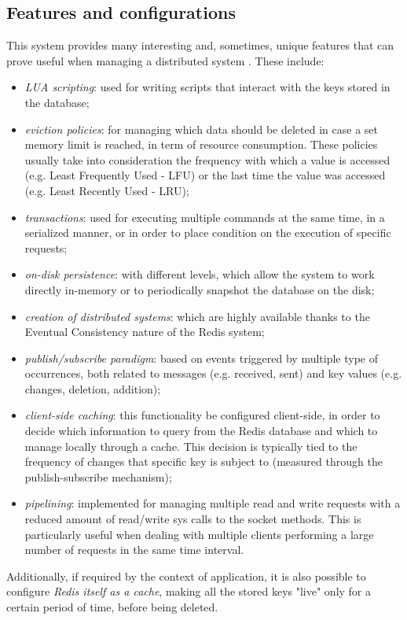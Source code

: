 \subsection{Features and configurations}
This system provides many interesting and, sometimes, unique features that can prove useful when managing a distributed system \cite{site:redis-doc}. These include:
\begin{itemize}
	\item \textit{LUA scripting}: used for writing scripts that interact with the keys stored in the database;
	\item \textit{eviction policies}: for managing which data should be deleted in case a set memory limit is reached, in term of resource consumption. These policies usually take into consideration the frequency with which a value is accessed (e.g. Least Frequently Used - LFU) or the last time the value was accessed (e.g. Least Recently Used - LRU);
	\item \textit{transactions}: used for executing multiple commands at the same time, in a serialized manner, or in order to place condition on the execution of specific requests;
	\item \textit{on-disk persistence}: with different levels, which allow the system to work directly in-memory or to periodically snapshot the database on the disk;
	\item \textit{creation of distributed systems}: which are highly available thanks to the Eventual Consistency nature of the Redis system;
	\item \textit{publish/subscribe paradigm}: based on events triggered by multiple type of occurrences, both related to messages (e.g. received, sent) and key values (e.g. changes, deletion, addition);
	\item \textit{client-side caching}: this functionality be configured client-side, in order to decide which information to query from the Redis database and which to manage locally through a cache. This decision is typically tied to the frequency of changes that specific key is subject to (measured through the publish-subscribe mechanism);
	\item \textit{pipelining}: implemented for managing multiple read and write requests with a reduced amount of read/write sys calls to the socket methods. This is particularly useful when dealing with multiple clients performing a large number of requests in the same time interval.
\end{itemize}
Additionally, if required by the context of application, it is also possible to configure \textit{Redis itself as a cache}, making all the stored keys "live" only for a certain period of time, before being deleted.

